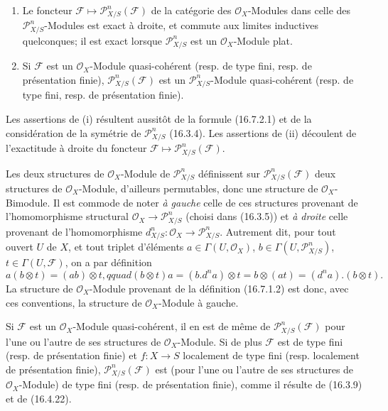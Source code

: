 \begin{proposition}[16.7.3]
\label{IV.16.7.3}
\begin{enumerate}
\item[(i)] Le foncteur
$\mathscr{F}\mapsto\mathscr{P}_{X/S}^n(\mathscr{F})$ de la catégorie des
$\mathcal{O}_X$-Modules dans celle des $\mathscr{P}_{X/S}^n$-Modules est
exact à droite, et commute aux limites inductives quelconques; il est exact
lorsque $\mathscr{P}_{X/S}^n$ est un $\mathcal{O}_X$-Module plat.
\item[(ii)] Si $\mathscr{F}$ est un $\mathcal{O}_X$-Module quasi-cohérent
(resp. de type fini, resp. de présentation finie),
$\mathscr{P}_{X/S}^n(\mathscr{F})$ est un $\mathscr{P}_{X/S}^n$-Module
quasi-cohérent (resp. de type fini, resp. de présentation finie).
\end{enumerate}
\end{proposition}

Les assertions de (i) résultent aussitôt de la formule (16.7.2.1) et de la
considération de la symétrie de $\mathscr{P}_{X/S}^n$ (16.3.4). Les assertions
de (ii) découlent de l'exactitude à droite du foncteur
$\mathscr{F}\mapsto\mathscr{P}_{X/S}^n(\mathscr{F})$.

\begin{env}[16.7.4]
\label{IV.16.7.4}
Les deux structures de $\mathcal{O}_X$-Module de $\mathscr{P}_{X/S}^n$
définissent sur $\mathscr{P}_{X/S}^n(\mathscr{F})$ deux structures de
$\mathcal{O}_X$-Module, d'ailleurs permutables, donc une structure de
$\mathcal{O}_X$-Bimodule. Il est commode de noter \emph{à gauche} celle de
ces structures provenant de l'homomorphisme structural
$\mathcal{O}_X\to\mathscr{P}_{X/S}^n$ (choisi dans (16.3.5)) et
\emph{à droite} celle provenant de l'homomorphisme
$d_{X/S}^n:\mathcal{O}_X\to\mathscr{P}_{X/S}^n$. Autrement dit, pour tout
ouvert $U$ de $X$, et tout triplet d'éléments
$a\in\Gamma(U,\mathcal{O}_X)$, $b\in\Gamma(U,\mathscr{P}_{X/S}^n)$,
$t\in\Gamma(U,\mathscr{F})$, on a par définition
\[
  a(b\otimes t)=(ab)\otimes t,qquad
  (b\otimes t)a=(b.d^na)\otimes t=b\otimes(at)
  =(d^na).(b\otimes t).
  \tag{16.7.4.1}
  \label{IV.16.7.4.1}
\]
La structure de $\mathcal{O}_X$-Module provenant de la définition (16.7.1.2)
est donc, avec ces conventions, la structure de $\mathcal{O}_X$-Module à
gauche.

Si $\mathscr{F}$ est un $\mathcal{O}_X$-Module quasi-cohérent, il en est de
même de $\mathscr{P}_{X/S}^n(\mathscr{F})$ pour l'une ou l'autre de ses
structures de $\mathcal{O}_X$-Module. Si de plus $\mathscr{F}$ est de type
fini (resp. de présentation finie) et $f:X\to S$ localement de type fini
(resp. localement de présentation finie),
$\mathscr{P}_{X/S}^n(\mathscr{F})$ est (pour l'une ou l'autre de ses
structures de $\mathcal{O}_X$-Module) de type fini (resp. de présentation
finie), comme il résulte de (16.3.9) et de (16.4.22).
\end{env}

